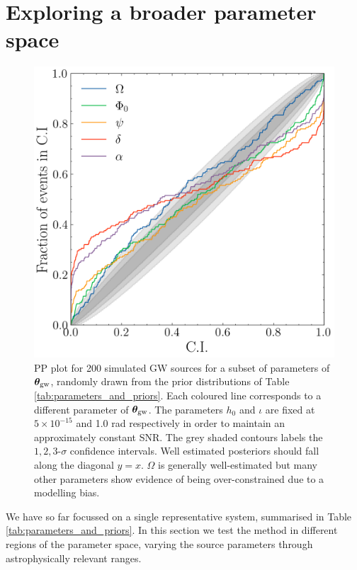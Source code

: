 \documentclass[fleqn,usenatbib,useAMS]{mnras}
\begin{document}
\section{Exploring a broader parameter space} \label{sec:parameter_space}
\begin{figure}
	\centering
	\includegraphics[width=\columnwidth]{images/pp_plot_new}
	\caption{PP plot for 200 simulated GW sources for a subset of parameters of $\boldsymbol{\theta}_{\rm gw}$, randomly drawn from the prior distributions of Table \ref{tab:parameters_and_priors}. Each coloured line corresponds to a different parameter of $\boldsymbol{\theta}_{\rm gw}$. The parameters $h_0$ and $\iota$ are fixed at $5 \times 10^{-15}$ and 1.0 rad respectively in order to maintain an approximately constant SNR. The grey shaded contours labels the $1,2,3$-$\sigma$ confidence intervals. Well estimated posteriors should fall along the diagonal $y=x$. $\Omega$ is generally well-estimated but many other parameters show evidence of being over-constrained due to a modelling bias. }
	\label{fig:parameter_space}
\end{figure}
We have so far focussed on a single representative system, summarised in Table \ref{tab:parameters_and_priors}. In this section we test the method in different regions of the parameter space, varying the source parameters through astrophysically relevant ranges. \newline 
\end{document}

